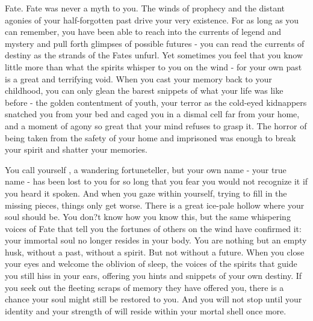 \documentclass[char]{Kos}
\begin{document}
\name{\cFugitive{}}

Fate. Fate was never a myth to you. The winds of prophecy and the distant agonies of your half-forgotten past drive your very existence. For as long as you can remember, you have been able to reach into the currents of legend and mystery and pull forth glimpses of possible futures - you can read the currents of destiny as the strands of the Fates unfurl. Yet sometimes you feel that you know little more than what the spirits whisper to you on the wind - for your own past is a great and terrifying void. When you cast your memory back to your childhood, you can only glean the barest snippets of what your life was like before - the golden contentment of youth, your terror as the cold-eyed kidnappers snatched you from your bed and caged you in a dismal cell far from your home, and a moment of agony so great that your mind refuses to grasp it. The horror of being taken from the safety of your home and imprisoned was enough to break your spirit and shatter your memories. 

You call yourself \cFugitive{}, a wandering fortuneteller, but your own name - your true name - has been lost to you for so long that you fear you would not recognize it if you heard it spoken. And when you gaze within yourself, trying to fill in the missing pieces, things only get worse. There is a great ice-pale hollow where your soul should be. You don?t know how you know this, but the same whispering voices of Fate that tell you the fortunes of others on the wind have confirmed it: your immortal soul no longer resides in your body. You are nothing but an empty husk, without a past, without a spirit. But not without a future. When you close your eyes and welcome the oblivion of sleep, the voices of the spirits that guide you still hiss in your ears, offering you hints and snippets of your own destiny. If you seek out the fleeting scraps of memory they have offered you, there is a chance your soul might still be restored to you. And you will not stop until your identity and your strength of will reside within your mortal shell once more.
\end{document}
